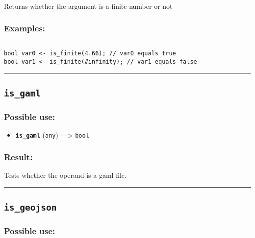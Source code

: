 \documentclass[]{book}
\providecommand{\tightlist}{%
  \setlength{\itemsep}{0pt}\setlength{\parskip}{0pt}}
\theoremstyle{definition}
\theoremstyle{definition}
\theoremstyle{definition}
\theoremstyle{remark}
\begin{document}
Returns whether the argument is a finite number or not

\subsubsection{Examples:}\label{examples-215}

\begin{verbatim}
 
bool var0 <- is_finite(4.66); // var0 equals true 
bool var1 <- is_finite(#infinity); // var1 equals false
\end{verbatim}

\begin{center}\rule{0.5\linewidth}{\linethickness}\end{center}

\subsection{\texorpdfstring{\texttt{is\_gaml}}{is\_gaml}}\label{is_gaml}

\subsubsection{Possible use:}\label{possible-use-289}

\begin{itemize}
\tightlist
\item
  \textbf{\texttt{is\_gaml}} (\texttt{any}) ---\textgreater{}
  \texttt{bool}
\end{itemize}

\subsubsection{Result:}\label{result-279}

Tests whether the operand is a gaml file.

\begin{center}\rule{0.5\linewidth}{\linethickness}\end{center}

\subsection{\texorpdfstring{\texttt{is\_geojson}}{is\_geojson}}\label{is_geojson}

\subsubsection{Possible use:}\label{possible-use-290}
\end{document}
